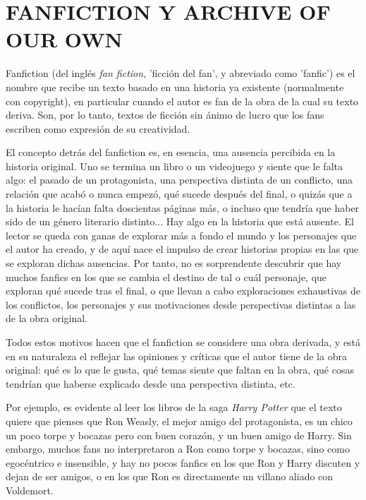 \documentclass{pre-tfg}
\begin{document}


\section{FANFICTION Y ARCHIVE OF OUR OWN}

Fanfiction (del inglés \textit{fan fiction}, 'ficción del fan', y abreviado como 'fanfic') es el nombre que recibe un texto basado en una historia ya existente (normalmente con copyright), en particular cuando el autor es fan de la obra de la cual su texto deriva. Son, por lo tanto, textos de ficción sin ánimo de lucro que los fans escriben como expresión de su creatividad.

El concepto detrás del fanfiction es, en esencia, una ausencia percibida en la historia original. Uno se termina un libro o un videojuego y siente que le falta algo: el pasado de un protagonista, una perspectiva distinta de un conflicto, una relación que acabó o nunca empezó, qué sucede después del final, o quizás que a la historia le hacían falta doscientas páginas más, o incluso que tendría que haber sido de un género literario distinto... Hay algo en la historia que está ausente. El lector se queda con ganas de explorar más a fondo el mundo y los personajes que el autor ha creado, y de aquí nace el impulso de crear historias propias en las que se exploran dichas ausencias. Por tanto, no es sorprendente descubrir que hay muchos fanfics en los que se cambia el destino de tal o cuál personaje, que exploran qué sucede tras el final, o que llevan a cabo exploraciones exhaustivas de los conflictos, los personajes y sus motivaciones desde perspectivas distintas a las de la obra original.

Todos estos motivos hacen que el fanfiction se considere una obra derivada\cite{woosh_1998}, y está en su naturaleza el reflejar las opiniones y críticas que el autor tiene de la obra original: qué es lo que le gusta, qué temas siente que faltan en la obra, qué cosas tendrían que haberse explicado desde una perspectiva distinta, etc.

Por ejemplo, es evidente al leer los libros de la saga \textit{Harry Potter} que el texto quiere que pienses que Ron Weasly, el mejor amigo del protagonista, es un chico un poco torpe y bocazas pero con buen corazón, y un buen amigo de Harry. Sin embargo, muchos fans no interpretaron a Ron como torpe y bocazas, sino como egocéntrico e insensible, y hay no pocos fanfics en los que Ron y Harry discuten y dejan de ser amigos, o en los que Ron es directamente un villano aliado con Voldemort.
\end{document}
